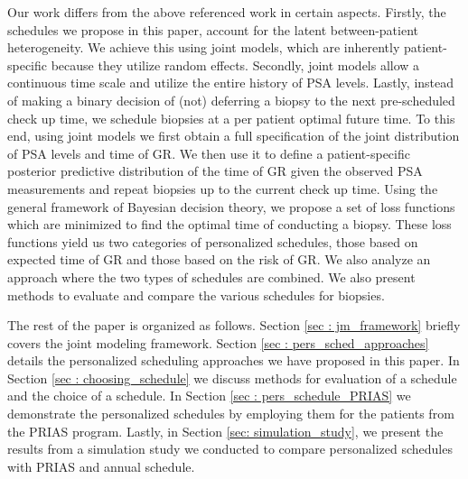 Our work differs from the above referenced work in certain aspects. Firstly, the schedules we propose in this paper, account for the latent between-patient heterogeneity. We achieve this using joint models, which are inherently patient-specific because they utilize random effects. Secondly, joint models allow a continuous time scale and utilize the entire history of PSA levels. Lastly, instead of making a binary decision of (not) deferring a biopsy to the next pre-scheduled check up time, we schedule biopsies at a per patient optimal future time. To this end, using joint models we first obtain a full specification of the joint distribution of PSA levels and time of GR. We then use it to define a patient-specific posterior predictive distribution of the time of GR given the observed PSA measurements and repeat biopsies up to the current check up time. Using the general framework of Bayesian decision theory, we propose a set of loss functions which are minimized to find the optimal time of conducting a biopsy. These loss functions yield us two categories of personalized schedules, those based on expected time of GR and those based on the risk of GR. We also analyze an approach where the two types of schedules are combined. We also present methods to evaluate and compare the various schedules for biopsies.

The rest of the paper is organized as follows. Section \ref{sec : jm_framework} briefly covers the joint modeling framework. Section \ref{sec : pers_sched_approaches} details the personalized scheduling approaches we have proposed in this paper. In Section \ref{sec : choosing_schedule} we discuss methods for evaluation of a schedule and the choice of a schedule. In Section \ref{sec : pers_schedule_PRIAS} we demonstrate the personalized schedules by employing them for the patients from the PRIAS program. Lastly, in Section \ref{sec: simulation_study}, we present the results from a simulation study we conducted to compare personalized schedules with PRIAS and annual schedule.